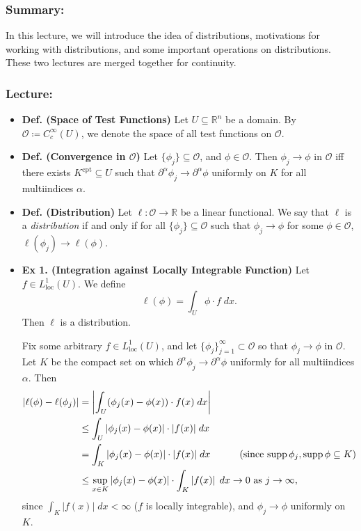 \documentclass{article}
\begin{document}
\subsubsection{Summary:}
In this lecture, we will introduce the idea of distributions, motivations for working with distributions, and some important operations on distributions. These two lectures are merged together for continuity. 
\subsubsection{Lecture:}
\begin{itemize}
	\item \textbf{Def. (Space of Test Functions)} Let $U \subseteq \mathbb{R}^{n}$ be a domain. By $\mathcal{O} \coloneqq C_{c}^{\infty}(U)$, we denote the space of all test functions on $\mathcal{O}$. 
	\item \textbf{Def. (Convergence in $\mathcal{O}$)} Let $\{\phi_{j}\} \subseteq \mathcal{O}$, and $\phi \in \mathcal{O}$. Then $\phi_{j} \to \phi$ in $\mathcal{O}$ iff there exists $K^{\text{cpt}} \subseteq U$ such that $\partial^{\alpha}\phi_{j} \to \partial^{\alpha}\phi$ uniformly on $K$ for all multiindices $\alpha$. 
	\item \textbf{Def. (Distribution)} Let $\ell: \mathcal{O} \to \mathbb{R}$ be a linear functional. We say that $\ell$ is a \textit{distribution} if and only if for all $\{\phi_{j}\} \subseteq \mathcal{O}$ such that $\phi_{j} \to\phi$ for some $\phi \in \mathcal{O}$, $\ell(\phi_{j}) \to \ell(\phi)$. 
	
	\item \textbf{Ex 1. (Integration against Locally Integrable Function)} Let $f \in L^{1}_{\text{loc}}(U)$. We define 
		\begin{equation}
			\ell(\phi)= \int_{U}\phi \cdot f\;dx. 
		\end{equation}
	Then $\ell$ is a distribution. 
	
	{\color{orange}
		Fix some arbitrary $f \in L^{1}_{\text{loc}}(U)$, and let $\{\phi_{j}\}_{j = 1}^{\infty} \subset \mathcal{O}$ so that $\phi_{j} \to \phi$ in $\mathcal{O}$. Let $K$ be the compact set on which $\partial^{\alpha}\phi_{j} \to \partial^{\alpha}\phi$ uniformly for all multiindices $\alpha$. Then 
			\begin{align}
				\begin{split}
					\left| \ell(\phi) - \ell(\phi_{j}) \right| &= \left| \int_{U}(\phi_{j}(x) - \phi(x))\cdot f(x)\;dx \right| \\
					&\leq \int_{U}|\phi_{j}(x) - \phi(x)|\cdot |f(x)|\;dx \\
					&= \int_{K}|\phi_{j}(x) - \phi(x)|\cdot |f(x)|\;dx \qquad \quad \text{(since $\operatorname{supp}{\phi_{j}}, \operatorname{supp}{\phi} \subseteq K$)}\\
					&\leq \sup_{x \in K}|\phi_{j}(x) - \phi(x)| \cdot \int_{K}\left| f(x) \right|\;dx \to 0 \text{ as $j \to \infty$}, 
				\end{split}
			\end{align}
		since $\int_{K}|f(x)|\;dx < \infty$ ($f$ is locally integrable), and $\phi_{j} \to \phi$ uniformly on $K$. 
	}
	

\end{itemize}
\end{document}

